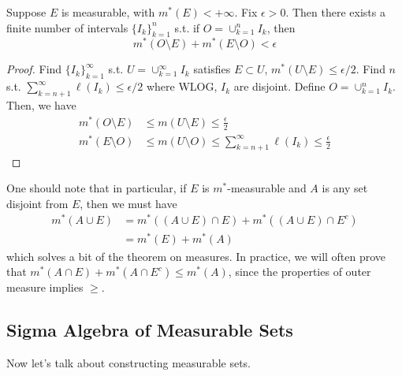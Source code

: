   \begin{theorem}[]
    Suppose $E$ is measurable, with $m^\ast (E) < +\infty$. Fix $\epsilon > 0$. Then there exists a finite number of intervals $\{I_k\}_{k=1}^n$ s.t. if $O = \cup_{ k=1}^n I_k$, then 
    \begin{equation}
      m^\ast (O \setminus E) + m^\ast (E \setminus O) < \epsilon
    \end{equation}
  \end{theorem}
  \begin{proof}
    Find $\{I_k\}_{k=1}^\infty$ s.t. $U = \cup_{k=1}^\infty I_k$ satisfies $E \subset U$, $m^\ast (U \setminus E) \leq \epsilon/2$. Find $n$ s.t. $\sum_{k=n+1}^\infty \ell(I_k) \leq \epsilon/2$ where WLOG, $I_k$ are disjoint. Define $O = \cup_{k=1}^n I_k$. Then, we have 
    \begin{align}
      m^\ast (O \setminus E) & \leq m(U \setminus E) \leq \frac{\epsilon}{2} \\ 
      m^\ast (E \setminus O) & \leq m(U \setminus O) \leq \sum_{k=n+1}^\infty \ell(I_k) \leq \frac{\epsilon}{2}
    \end{align}
  \end{proof}

  One should note that in particular, if $E$ is $m^\ast$-measurable and $A$ is any set disjoint from $E$, then we must have 
  \begin{align}
    m^\ast (A \cup E) & = m^\ast ((A \cup E) \cap E) + m^\ast ((A \cup E) \cap E^c) \\ 
                        & = m^\ast (E) + m^\ast (A)
  \end{align}
  which solves a bit of the theorem on measures. In practice, we will often prove that $m^\ast (A \cap E) + m^\ast (A \cap E^c) \leq m^\ast (A)$, since the properties of outer measure implies $\geq$. 

\subsection{Sigma Algebra of Measurable Sets}

  Now let's talk about constructing measurable sets. 


